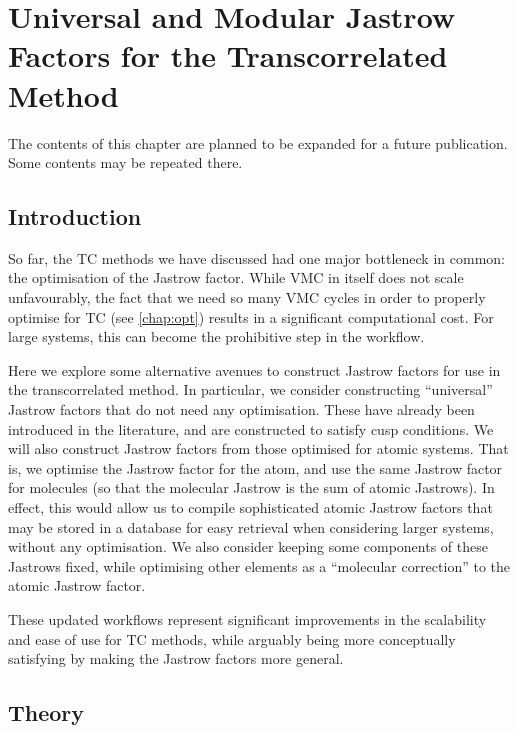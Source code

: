 \chapter{Universal and Modular Jastrow Factors for the Transcorrelated Method}
\label{chap:universal}

The contents of this chapter are planned to be expanded for a future publication. Some contents may be repeated there.

\section{Introduction}

So far, the \gls{TC} methods we have discussed had one major bottleneck in common: the optimisation of the Jastrow factor. While VMC in itself does not scale unfavourably, the fact that we need so many VMC cycles in order to properly optimise for TC (see \autoref{chap:opt}) results in a significant computational cost. For large systems, this can become the prohibitive step in the workflow.

Here we explore some alternative avenues to construct Jastrow factors for use in the transcorrelated method. In particular, we consider constructing ``universal'' Jastrow factors that do not need any optimisation. These have already been introduced in the literature,\supercite{fournaisNonIsotropic2007,fournaisSharp2005,tewSecond2008,szenesStriking2024} and are constructed to satisfy cusp conditions. We will also construct Jastrow factors from those optimised for atomic systems. That is, we optimise the Jastrow factor for the atom, and use the same Jastrow factor for molecules (so that the molecular Jastrow is the sum of atomic Jastrows). In effect, this would allow us to compile sophisticated atomic Jastrow factors that may be stored in a database for easy retrieval when considering larger systems, without any optimisation. We also consider keeping some components of these Jastrows fixed, while optimising other elements as a ``molecular correction'' to the atomic Jastrow factor.

These updated workflows represent significant improvements in the scalability and ease of use for TC methods, while arguably being more conceptually satisfying by making the Jastrow factors more general.

\section{Theory}

